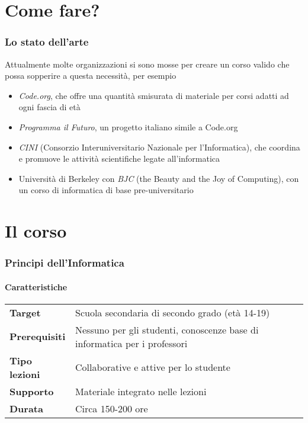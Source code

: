 \documentclass{beamer}
\begin{document}
\section{Come fare?}

\begin{frame}
  \frametitle{Lo stato dell'arte}

  Attualmente molte organizzazioni si sono mosse per creare un corso valido che possa sopperire a questa necessità, per esempio
  
  \begin{itemize}
    \item \emph{Code.org}, che offre una quantità smisurata di materiale per corsi adatti ad ogni fascia di età
    \item \emph{Programma il Futuro}, un progetto italiano simile a Code.org
    \item \emph{CINI} (Consorzio Interuniversitario Nazionale per l'Informatica), che coordina e promuove le attività scientifiche legate all'informatica
    \item Università di Berkeley con \emph{BJC} (the Beauty and the Joy of Computing), con un corso di informatica di base pre-universitario
  \end{itemize}
\end{frame}

\section{Il corso}

\begin{frame}
  \frametitle{Principi dell'Informatica}
  \framesubtitle{Caratteristiche}

  \begin{table}
  \begin{tabular}{l p{75mm}}
    \textbf{Target} & Scuola secondaria di secondo grado (età 14-19) \\
    \textbf{Prerequisiti} & Nessuno per gli studenti, conoscenze base di informatica per i professori \\
    \textbf{Tipo lezioni} & Collaborative e attive per lo studente \\
    \textbf{Supporto} & Materiale integrato nelle lezioni \\
    \textbf{Durata} & Circa 150-200 ore
  \end{tabular}
  \end{table}
\end{frame}
\end{document}
